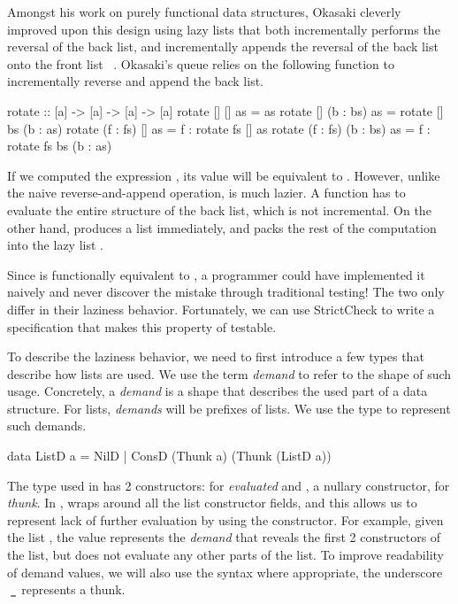 \documentclass[acmsmall,review]{acmart}\settopmatter{}
\begin{document}
Amongst his work on purely functional data structures\cite{Okasaki},
Okasaki cleverly improved upon this design using lazy lists that both
incrementally performs the reversal of the back list, and
incrementally appends the reversal of the back list onto the front
list ~\cite{Okasaki95simpleand}. Okasaki's queue relies on the
following  function to incrementally reverse and append the
back list.
\begin{inlinecode}
  rotate :: [a] -> [a] -> [a] -> [a]
  rotate      []       []  as =                       as
  rotate      []  (b : bs) as =     rotate [] bs (b : as)
  rotate (f : fs)      []  as = f : rotate fs []      as
  rotate (f : fs) (b : bs) as = f : rotate fs bs (b : as)
\end{inlinecode}
If we computed the expression , its value
will be equivalent to . However, unlike
the naive reverse-and-append operation,  is much
lazier. A  function has to evaluate the entire structure
of the back list, which is not incremental. On the other
hand,  produces a list immediately, and packs the rest of
the computation into the lazy list .

Since  is functionally equivalent to , a programmer could have implemented it naively and never
discover the mistake through traditional testing! The two only differ
in their laziness behavior. Fortunately, we can use StrictCheck to
write a specification that makes this property of 
testable.

To describe the laziness behavior, we need to first introduce a few
types that describe how lists are used. We use the
term \textit{demand} to refer to the shape of such usage. Concretely,
a \textit{demand} is a shape that describes the used part of a data
structure. For lists, \textit{demands} will be prefixes of lists. We
use the type  to represent such demands.
%
\begin{inlinecode}
  data ListD a = NilD
               | ConsD (Thunk a) (Thunk (ListD a))
\end{inlinecode}
%
The  type used in  has 2 constructors: 
for \textit{evaluated} and , a nullary constructor,
for \textit{thunk}. In ,  wraps around all the
list constructor fields, and this allows us to represent lack of
further evaluation by using the  constructor. For example, given
the list \lk{[1, 2, 3]}, the value  represents
the \textit{demand} that reveals the first 2  constructors of
the list, but does not evaluate any other parts of the list. To
improve readability of demand values, we will also use the
syntax \lk{\_ : \_ : \_} where appropriate, the underscore $\lk{\_}$
represents a thunk.
\end{document}
